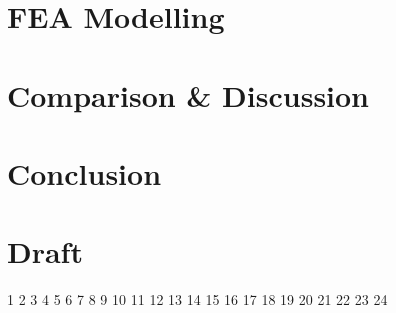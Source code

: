 \documentclass [a4 paper, 11pt, titlepage] {article}
\begin{document}
	
	
	
	
	\section{FEA Modelling}
	\section{Comparison \& Discussion}
	\section{Conclusion}


	\section{Draft}
	1\cite{alberti_theory_2011}
	2\cite{babitsky_investigation_2019}
	3\cite{boglietti_electrical_2014}
	4\cite{carraro_design_2018}
	5\cite{choi_reduction_2016}
	6\cite{dajaku_advanced_2019}
	7\cite{el-refaie_advanced_2014}
	8\cite{el-refaie_fractional-slot_2010}
	9\cite{el-refaie_fractional-slot_2013}
	10\cite{farshadnia_advanced_2018}
	11\cite{farshadnia_detailed_2016}
	12\cite{geun-ho_lee_torque_2008}
	13\cite{guemes_comparative_2010}
	14\cite{han_torque_2007}
	15\cite{he_evaluation_2019}
	16\cite{howell_getting_2018}
	17\cite{jussila_guidelines_2007}
	18\cite{masmoudi_design_2019}
	19\cite{reddy_generalized_2014}
	20\cite{seok-hee_han_torque_2010}
	21\cite{yokoi_general_2016}
	22\cite{zhu_analysis_2018}
	23\cite{zhu_novel_2019}
	24\cite{zuopeng_design_2017}
	\newpage
	
	 
	
\end{document}
